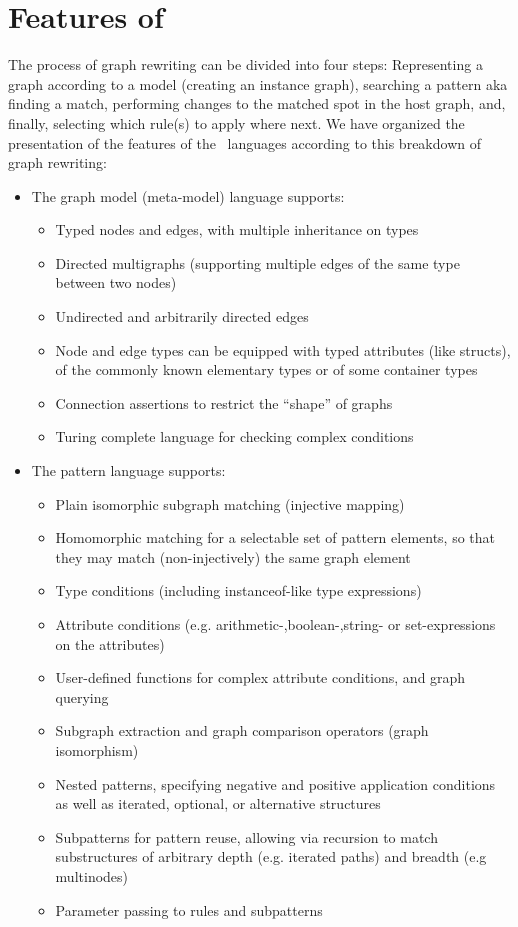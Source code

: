 \section{Features of \GrG}

The process of graph rewriting can be divided into four steps:
Representing a graph according to a model (creating an instance graph),
searching a pattern aka finding a match,
performing changes to the matched spot in the host graph,
and, finally, selecting which rule(s) to apply where next.
We have organized the presentation of the features of the \GrG\ languages according to this breakdown of graph rewriting:

\begin{itemize}
  \item The graph model (meta-model) language supports:
  \begin{itemize}
    \item Typed nodes and edges, with multiple inheritance on types
    \item Directed multigraphs (supporting multiple edges of the same type between two nodes)
    \item Undirected and arbitrarily directed edges
    \item Node and edge types can be equipped with typed attributes (like structs), of the commonly known elementary types or of some container types
    \item Connection assertions to restrict the ``shape'' of graphs
    \item Turing complete language for checking complex conditions
  \end{itemize}

  \item The pattern language supports:
  \begin{itemize}
    \item Plain isomorphic subgraph matching (injective mapping)
    \item Homomorphic matching for a selectable set of pattern elements, so that they may match (non-injectively) the same graph element
    \item Type conditions (including instanceof-like type expressions)
    \item Attribute conditions (e.g. arithmetic-,boolean-,string- or set-expressions on the attributes)
    \item User-defined functions for complex attribute conditions, and graph querying
    \item Subgraph extraction and graph comparison operators (graph isomorphism)
    \item Nested patterns, specifying negative and positive application conditions as well as iterated, optional, or alternative structures
    \item Subpatterns for pattern reuse, allowing via recursion to match substructures of arbitrary depth (e.g. iterated paths) and breadth (e.g multinodes)
    \item Parameter passing to rules and subpatterns
  \end{itemize}


\end{itemize}

